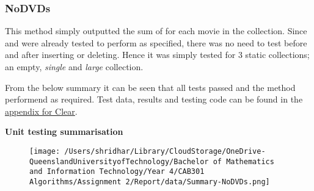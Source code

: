 \documentclass[a4paper]{article}
\begin{document}
\subsubsection{NoDVDs}
This method simply outputted the sum of  for each movie in the collection. Since  and  were already tested to perform as specified, there was no need to test  before and after inserting or deleting. Hence it was simply tested for 3 static collections; an empty, \textit{single} and \textit{large} collection.
\vspace{1mm}

\noindent
From the below summary it can be seen that all tests passed and the method performend as required. Test data, results and testing code can be found in the \hyperlink{subsubsection.5.3.7}{appendix for Clear}.
\vspace{2mm}

\noindent
\textbf{Unit testing summarisation}
\begin{figure}[H]
   \texttt{[image: /Users/shridhar/Library/CloudStorage/OneDrive-QueenslandUniversityofTechnology/Bachelor of Mathematics and Information Technology/Year 4/CAB301 Algorithms/Assignment 2/Report/data/Summary-NoDVDs.png]}
\end{figure}
\end{document}
